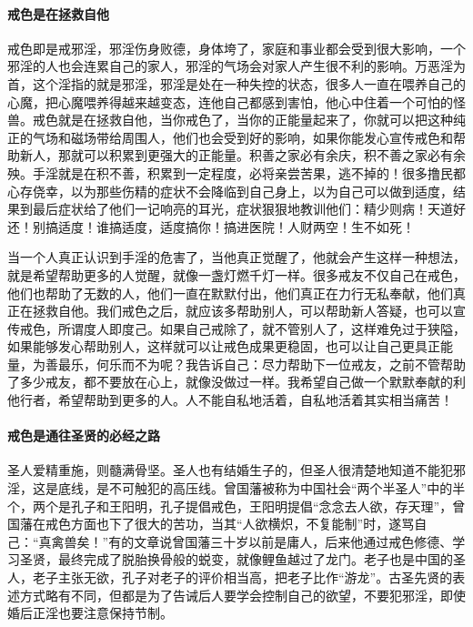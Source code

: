 \paragraph{戒色是在拯救自他}

戒色即是戒邪淫，邪淫伤身败德，身体垮了，家庭和事业都会受到很大影响，一个邪淫的人也会连累自己的家人，邪淫的气场会对家人产生很不利的影响。万恶淫为首，这个淫指的就是邪淫，邪淫是处在一种失控的状态，很多人一直在喂养自己的心魔，把心魔喂养得越来越变态，连他自己都感到害怕，他心中住着一个可怕的怪兽。戒色就是在拯救自他，当你戒色了，当你的正能量起来了，你就可以把这种纯正的气场和磁场带给周围人，他们也会受到好的影响，如果你能发心宣传戒色和帮助新人，那就可以积累到更强大的正能量。积善之家必有余庆，积不善之家必有余殃。手淫就是在积不善，积累到一定程度，必将亲尝苦果，逃不掉的！很多撸民都心存侥幸，以为那些伤精的症状不会降临到自己身上，以为自己可以做到适度，结果到最后症状给了他们一记响亮的耳光，症状狠狠地教训他们：精少则病！天道好还！别搞适度！谁搞适度，适度搞你！搞进医院！人财两空！生不如死！

当一个人真正认识到手淫的危害了，当他真正觉醒了，他就会产生这样一种想法，就是希望帮助更多的人觉醒，就像一盏灯燃千灯一样。很多戒友不仅自己在戒色，他们也帮助了无数的人，他们一直在默默付出，他们真正在力行无私奉献，他们真正在拯救自他。我们戒色之后，就应该多帮助别人，可以帮助新人答疑，也可以宣传戒色，所谓度人即度己。如果自己戒除了，就不管别人了，这样难免过于狭隘，如果能够发心帮助别人，这样就可以让戒色成果更稳固，也可以让自己更具正能量，为善最乐，何乐而不为呢？我告诉自己：尽力帮助下一位戒友，之前不管帮助了多少戒友，都不要放在心上，就像没做过一样。我希望自己做一个默默奉献的利他行者，希望帮助到更多的人。人不能自私地活着，自私地活着其实相当痛苦！

\paragraph{戒色是通往圣贤的必经之路}

圣人爱精重施，则髓满骨坚。圣人也有结婚生子的，但圣人很清楚地知道不能犯邪淫，这是底线，是不可触犯的高压线。曾国藩被称为中国社会“两个半圣人”中的半个，两个是孔子和王阳明，孔子提倡戒色，王阳明提倡“念念去人欲，存天理”，曾国藩在戒色方面也下了很大的苦功，当其“人欲横炽，不复能制”时，遂骂自己：“真禽兽矣！”有的文章说曾国藩三十岁以前是庸人，后来他通过戒色修德、学习圣贤，最终完成了脱胎换骨般的蜕变，就像鲤鱼越过了龙门。老子也是中国的圣人，老子主张无欲，孔子对老子的评价相当高，把老子比作“游龙”。古圣先贤的表述方式略有不同，但都是为了告诫后人要学会控制自己的欲望，不要犯邪淫，即使婚后正淫也要注意保持节制。


